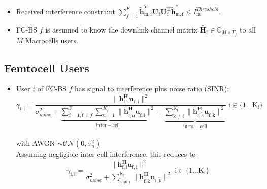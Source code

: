 \documentclass[12pt,a4paper]{report}
\begin{document}
\begin{itemize}
\item 
	Received interference constraint
	$\sum^F_{f=1} \mathbf{\tilde{h}}_{\mathrm{m,f}}^T  \mathbf{U_{\mathrm{f}}} 						
	\mathbf{U_{\mathrm{f}}^{\mathrm{H}}} \mathbf{\tilde{h}_{\mathrm{m,f}}^*} \leq I^{Threshold}		
	_{\mathrm{m}} $.

\item 
	FC-BS $f$ is assumed to know the downlink channel matrix $\tilde{\mathbf{H}_{\mathrm{f}}} \in \mathbb{C}_{M \times T_f}$ to all $M$ Macrocells users.
\\
\end{itemize}

\subsection{Femtocell Users}
\begin{itemize}

\item User $i$ of FC-BS $f$ has signal to interference plus noise ratio (SINR):
	\begin{equation*}
	\gamma_{\mathrm{f,i}} = \frac{\|\mathbf{h^H_{\mathrm{f,i}}u_{\mathrm{f,i}}}\|^2}
	{\sigma^2_{noise}   +
	\underbrace{
	 \sum_{\mathrm{\tilde{f}}=1,\mathrm{\tilde{f}}\neq f}^{\mathrm{F}} \sum_{\mathrm{u=1}}^{K_{\mathrm{\tilde{f}}}}
	\|\mathbf{h^H_{\mathrm{\tilde{f},u}}u_{\mathrm{\tilde{f},i}}}\|^2}_{\mathrm{inter-cell}}
	 + 
	 \underbrace{
	 \sum_{\mathrm{\tilde{k}\neq i}}^{\mathrm{K_f}}
	 \|\mathbf{h^H_{\mathrm{f,\tilde{k}}}u_{\mathrm{f,\tilde{k}}}}\|^2}_{\mathrm{intra-cell}}}
	  \; \mathrm{i \in \{1 ... K_f\}}\end{equation*}
\\
with AWGN $\sim \mathcal{CN}(0,\sigma^2_n)$
\\

Assuming negligible inter-cell interference, this reduces to
	\begin{equation*}
	\gamma_{\mathrm{f,i}} = \frac{\|\mathbf{h^H_{\mathrm{f,i}}u_{\mathrm{f,i}}}\|^2}
	{\sigma^2_{noise} 
	 + \sum_{\mathrm{\tilde{k}\neq i}}^{\mathrm{K_f}}
	  \|\mathbf{h^H_{\mathrm{f,\tilde{k}}}u_{\mathrm{f,\tilde{k}}}}\|^2}
	  \; \mathrm{i \in \{1 ... K_f\}}
	\end{equation*}
\\


\end{itemize}
\end{document}
